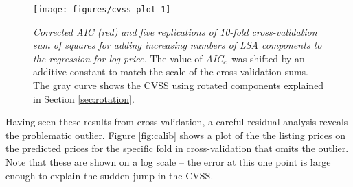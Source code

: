 \documentclass[12pt]{article}\usepackage[]{graphicx}\usepackage[]{color}
\makeatletter
\newenvironment{kframe}{%
 \def\at@end@of@kframe{}%
 \ifinner\ifhmode%
  \def\at@end@of@kframe{\end{minipage}}%
  \begin{minipage}{\columnwidth}%
 \fi\fi%
 \def\FrameCommand##1{\hskip\@totalleftmargin \hskip-\fboxsep
 \colorbox{shadecolor}{##1}\hskip-\fboxsep
     \hskip-\linewidth \hskip-\@totalleftmargin \hskip\columnwidth}%
 \MakeFramed {\advance\hsize-\width
   \@totalleftmargin\z@ \linewidth\hsize
   \@setminipage}}%
 {\par\unskip\endMakeFramed%
 \at@end@of@kframe}
\newenvironment{knitrout}{}{} %
\newcommand{\aicc}{\mbox{\it AIC$_c$}}
\makeatother
\begin{document}



\begin{figure}
\begin{knitrout}
\color{fgcolor}

{\centering \texttt{[image: figures/cvss-plot-1]} 

}


\begin{kframe}

{\ttfamily\noindent\bfseries\color{errorcolor}{\#\# Error in plot.new(): figure margins too large}}

{\ttfamily\noindent\bfseries\color{errorcolor}{\#\# Error in plot.xy(xy.coords(x, y), type = type, ...): invalid graphics state}}

{\ttfamily\noindent\bfseries\color{errorcolor}{\#\# Error in plot.xy(xy.coords(x, y), type = type, ...): invalid graphics state}}

{\ttfamily\noindent\bfseries\color{errorcolor}{\#\# Error in plot.xy(xy.coords(x, y), type = type, ...): invalid graphics state}}

{\ttfamily\noindent\bfseries\color{errorcolor}{\#\# Error in plot.xy(xy.coords(x, y), type = type, ...): invalid graphics state}}

{\ttfamily\noindent\bfseries\color{errorcolor}{\#\# Error in plot.xy(xy.coords(x, y), type = type, ...): invalid graphics state}}\end{kframe}
\end{knitrout}

\caption{ \label{fig:cvss}
 {\sl Corrected AIC (red) and five replications of 10-fold
 cross-validation sum of squares for adding increasing numbers of LSA
 components to the regression for log price. }  The value of \aicc\
 was shifted by an additive constant to match the scale of the
 cross-validation sums.  The gray curve shows the CVSS using rotated
 components explained in Section \ref{sec:rotation}. }
\end{figure}

 Having seen these results from cross validation, a careful residual
 analysis reveals the problematic outlier.  Figure \ref{fig:calib}
 shows a plot of the the listing prices on the predicted prices for
 the specific fold in cross-validation that omits the outlier.  Note
 that these are shown on a log scale -- the error at this one point is
 large enough to explain the sudden jump in the CVSS.
\end{document}
